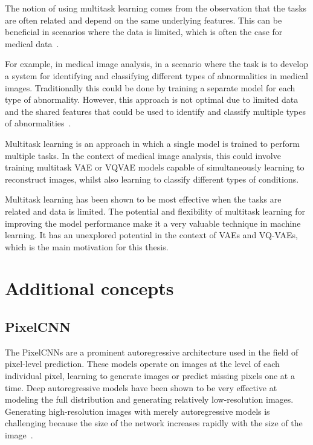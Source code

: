 The notion of using multitask learning comes from the observation that the tasks are often related and depend on the same underlying features. This can be beneficial in scenarios where the data is limited, which is often the case for medical data~\cite{medicalMultiTask}.

For example, in medical image analysis, in a scenario where the task is to develop a system for identifying and classifying different types of abnormalities in medical images. Traditionally this could be done by training a separate model for each type of abnormality. However, this approach is not optimal due to limited data and the shared features that could be used to identify and classify multiple types of abnormalities~\cite{multitasklearning}.

Multitask learning is an approach in which a single model is trained to perform multiple tasks. In the context of medical image analysis, this could involve training multitask VAE or VQVAE models capable of simultaneously learning to reconstruct images, whilst also learning to classify different types of conditions. 

Multitask learning has been shown to be most effective when the tasks are related and data is limited. The potential and flexibility of multitask learning for improving the model performance make it a very valuable technique in machine learning. It has an unexplored potential in the context of VAEs and VQ-VAEs, which is the main motivation for this thesis.

\section{Additional concepts}

\subsection{PixelCNN}\label{background:pixelcnn}

The PixelCNNs are a prominent autoregressive architecture used in the field of pixel-level prediction. These models operate on images at the level of each individual pixel, learning to generate images or predict missing pixels one at a time. Deep autoregressive models have been shown to be very effective at modeling the full distribution and generating relatively low-resolution images. Generating high-resolution images with merely autoregressive models is challenging because the size of the network increases rapidly with the size of the image~\cite{pixelcnn, pixelrnn}.

